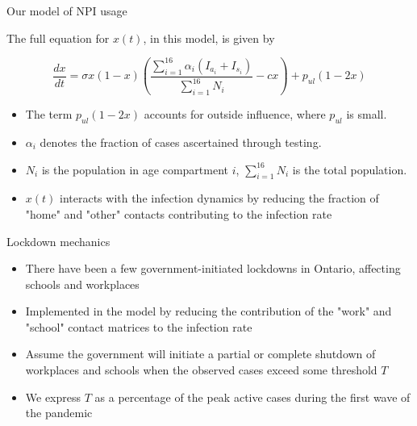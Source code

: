 \documentclass{beamer}
\begin{document}
\begin{frame}{Our model of NPI usage}

    The full equation for $x(t)$, in this model, is given by

    \begin{equation}{}
        \frac{d x}{dt} = \sigma x (1 - x) \left(\frac{\sum_{i=1}^{16}\alpha_i(I_{a_i} + I_{s_i})}{\sum_{i=1}^{16} N_i} - c x\right) + p_{ul}(1-2 x) 
    \end{equation}

    \begin{itemize}

    \item The term $p_{ul}(1-2 x)$ accounts for outside influence, where $p_{ul}$ is small.
    
    \item $\alpha_i$ denotes the fraction of cases ascertained through testing.
    
    \item $N_i$ is the population in age compartment $i$, $\sum_{i=1}^{16} N_i$ is the total population. 
    \item $x(t)$ interacts with the infection dynamics by reducing the fraction of "home" and "other" contacts contributing to the infection rate
    \end{itemize}

\end{frame}


\begin{frame}{Lockdown mechanics}
    \begin{itemize}
        \item There have been a few government-initiated lockdowns in Ontario, affecting schools and workplaces
        
        \item Implemented in the model by reducing the contribution of the "work" and "school" contact matrices to the infection rate
        
        \item Assume the government will initiate a partial or complete shutdown of workplaces and schools when the observed cases exceed some threshold $T$
        \item We express $T$ as a percentage of the peak active cases during the first wave of the pandemic
    \end{itemize}
    
\end{frame}
\end{document}
